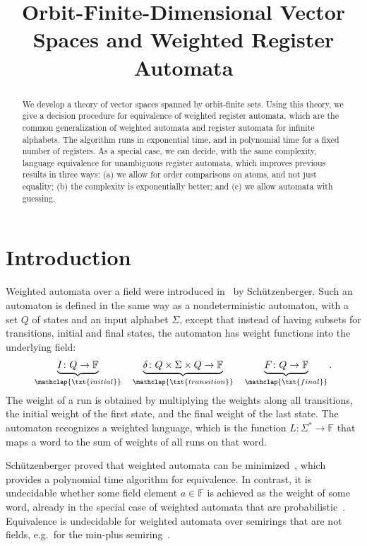 \documentclass{theoretics}
\title{Orbit-Finite-Dimensional Vector Spaces  and Weighted Register Automata}
\newcommand{\myunderbrace}[2]{\underbrace{#1}_{\mathclap{\txt{\scriptsize #2}}}}
\newcommand{\field}{\mathbb F}
\newcommand{\schutz}{Sch\"utzenberger\xspace}
\begin{document}
\maketitle

\begin{abstract}
We develop a theory of vector spaces spanned by orbit-finite sets. Using this theory, we give a decision procedure for equivalence of weighted register automata,  which are the common generalization of weighted automata and register automata for infinite alphabets. The algorithm runs in exponential time, and in polynomial time for a fixed number of registers. As a special case, we can decide, with the same complexity, language equivalence for unambiguous register automata, which  improves previous results in three ways:
(a) we allow for order comparisons on atoms, and not just equality;
(b) the complexity is exponentially better; and (c) we allow automata with guessing. 
\end{abstract}


\section{Introduction}
Weighted automata over a field were introduced in~\cite{schutzenberger1961definition} by \schutz. Such an automaton is defined in the same way as a nondeterministic automaton, with a set $Q$ of states and an input alphabet $\Sigma$, except that instead of having subsets for transitions, initial and final states, the automaton has weight functions into the underlying field:
\begin{align*}
    \myunderbrace{I \colon Q \to \field}{initial} 
    \quad 
    \myunderbrace{\delta \colon Q \times \Sigma \times Q \to \field}{transition}
    \quad 
    \myunderbrace{F \colon Q \to \field}{final}.
\end{align*}
The weight of a run is obtained by multiplying the weights along all transitions, the initial weight of the first state, and the final weight of the last state. The  automaton recognizes a weighted language, which  is the function $L \colon \Sigma^* \to \field$ that maps a word to the sum of weights of all runs on that word.   

\schutz proved that weighted automata can be minimized~\cite[Sec.~B]{schutzenberger1961definition},
which provides a polynomial time algorithm for equivalence.
In contrast, it is undecidable whether some field element $a \in \field$ is achieved as the weight of some  word,  already in the special case of weighted automata that are probabilistic~\cite[Thm.~22]{nasu1969mappings}. Equivalence  is undecidable for weighted automata over semirings that are not fields, e.g.~for the min-plus semiring~\cite[Cor.~4.3]{krob1992}.
\end{document}
